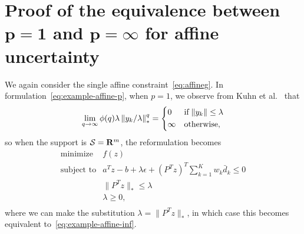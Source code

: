 \section{Proof of the equivalence between $\mathbf{p =1}$ and  $\mathbf{p = \infty}$ for affine uncertainty}
\label{app:equivalence}
We again consider the single affine constraint~\eqref{eq:affineg}. In formulation~\eqref{eq:example-affine-p}, when $p=1$, we observe from Kuhn et al.~\citep[Section 2.2 Remark 1]{kuhn2019wasserstein} that
\begin{equation*}
	 \lim_{q \rightarrow \infty}\phi(q)\lambda \left\|y_{k}/\lambda \right\|^q_* =
	\begin{dcases} 0 & \text{if}\; \|y_{k} \| \leq \lambda \\
		\infty & \text{otherwise},
	\end{dcases}
	\end{equation*}
so when the support is $\mathcal{S} = {\mathbf R}^m$, the reformulation becomes
\begin{equation}
	\begin{array}{ll}
		\mbox{minimize} & f(z)\\
		\mbox{subject to} & a^Tz - b +\lambda \epsilon + (P^Tz)^T\sum_{k=1}^{K} w_k \bar{d}_k \le 0\\
		& \|P^Tz \|_* \leq \lambda \\
		& \lambda \ge 0,\\
	\end{array}
\end{equation}
where we can make the substitution $\lambda = \| P^Tz \|_*$, in which case this becomes equivalent to~\eqref{eq:example-affine-inf}.

